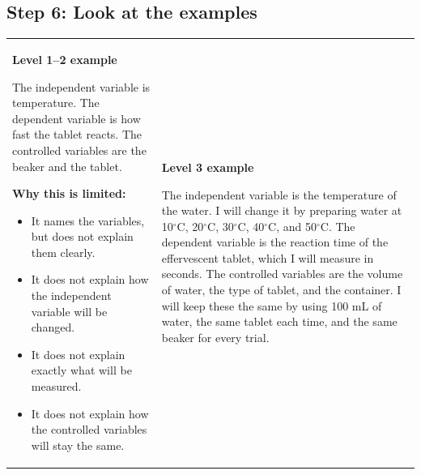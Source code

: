\documentclass[12pt]{article}
\begin{document}

\subsection*{Step 6: Look at the examples}

\begin{tabularx}{\textwidth}{>{\raggedright\arraybackslash}X >{\raggedright\arraybackslash}X}

\begin{minipage}[t]{\linewidth}
\textbf{Level 1--2 example}

\begin{tcolorbox}[colback=mygray,colframe=black]
The independent variable is temperature. The dependent variable is how fast the tablet reacts. The controlled variables are the beaker and the tablet.
\end{tcolorbox}

\textbf{Why this is limited:}
\begin{itemize}[leftmargin=1.5em]
    \item It names the variables, but does not explain them clearly.
    \item It does not explain how the independent variable will be changed.
    \item It does not explain exactly what will be measured.
    \item It does not explain how the controlled variables will stay the same.
\end{itemize}
\end{minipage}

&
\begin{minipage}[t]{\linewidth}
\textbf{Level 3 example}

\begin{tcolorbox}[colback=mygray,colframe=black]
The independent variable is the temperature of the water. I will change it by preparing water at 10$^\circ$C, 20$^\circ$C, 30$^\circ$C, 40$^\circ$C, and 50$^\circ$C. The dependent variable is the reaction time of the effervescent tablet, which I will measure in seconds. The controlled variables are the volume of water, the type of tablet, and the container. I will keep these the same by using 100 mL of water, the same tablet each time, and the same beaker for every trial.
\end{tcolorbox}
\end{minipage}

\\
\end{tabularx}
\end{document}
